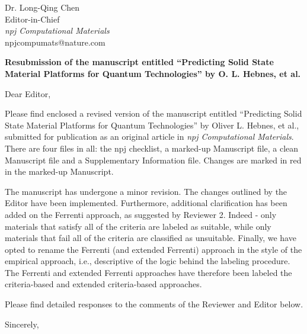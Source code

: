 \documentclass[11pt, a4paper]{letter} %
\begin{document}

\begin{letter}{
	Dr. Long-Qing Chen\\
	Editor-in-Chief\\
	\textit{npj Computational Materials} \\ 
	npjcompumats@nature.com \\ 
}


\opening{}

\begin{center}
   \textbf{Resubmission of the manuscript entitled “Predicting Solid State Material Platforms for Quantum Technologies” by O. L. Hebnes, et al.}
\end{center}

\noindent
Dear Editor, 

Please find enclosed a revised version of the manuscript entitled “Predicting Solid State Material Platforms for Quantum Technologies” by Oliver L. Hebnes, et al., submitted for publication as an original article in \textit{npj Computational Materials}. There are four files in all: the npj checklist, a marked-up Manuscript file, a clean Manuscript file and a Supplementary Information file. Changes are marked in red in the marked-up Manuscript.

The manuscript has undergone a minor revision. The changes outlined by the Editor have been implemented. Furthermore, additional clarification has been added on the Ferrenti approach, as suggested by Reviewer 2. Indeed - only materials that satisfy all of the criteria are labeled as suitable, while only materials that fail all of the criteria are classified as unsuitable. Finally, we have opted to rename the Ferrenti (and extended Ferrenti) approach in the style of the empirical approach, i.e., descriptive of the logic behind the labeling procedure. The Ferrenti and extended Ferrenti approaches have therefore been labeled the criteria-based and extended criteria-based approaches. 

Please find detailed responses to the comments of the Reviewer and Editor below.

Sincerely,  


\end{letter}
\end{document}
